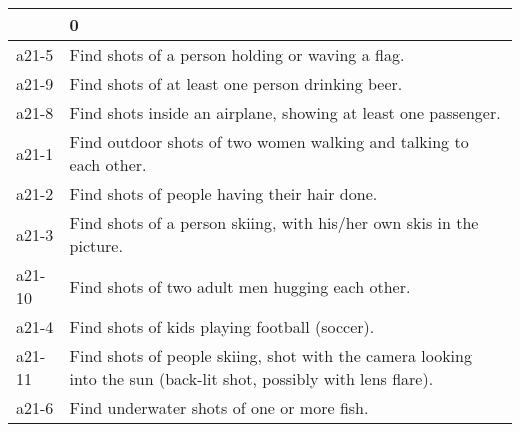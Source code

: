 \begin{tabular}{ll}
\toprule
{} &                                                                                                                  0 \\
\midrule
a21-5  &                                                                   Find shots of a person holding or waving a flag. \\
a21-9  &                                                                   Find shots of at least one person drinking beer. \\
a21-8  &                                                     Find shots inside an airplane, showing at least one passenger. \\
a21-1  &                                                 Find outdoor shots of two women walking and talking to each other. \\
a21-2  &                                                                       Find shots of people having their hair done. \\
a21-3  &                                               Find shots of a person skiing, with his/her own skis in the picture. \\
a21-10 &                                                                    Find shots of two adult men hugging each other. \\
a21-4  &                                                                      Find shots of kids playing football (soccer). \\
a21-11 &  Find shots of people skiing, shot with the camera looking into the sun (back-lit shot, possibly with lens flare). \\
a21-6  &                                                                         Find underwater shots of one or more fish. \\
\bottomrule
\end{tabular}
